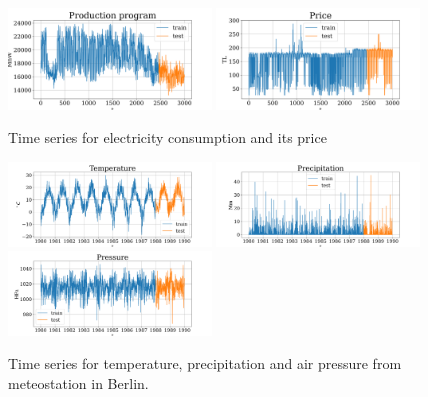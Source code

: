 	\begin{figure}[h]
		\centering
		\includegraphics[width=0.48\textwidth, keepaspectratio]{../../figs/Electricity_Production}
		\includegraphics[width=0.48\textwidth, keepaspectratio]{../../figs/Electricity_Price}
		\caption{Time series for electricity consumption and its price}\label{fig:electr_data}
	\end{figure}
	
	\begin{figure}[h]
		\centering
		\includegraphics[width=0.48\textwidth, keepaspectratio]{../../figs/Temperature.png}
		\includegraphics[width=0.48\textwidth, keepaspectratio]{../../figs/Precipitation.png}
		\includegraphics[width=0.48\textwidth, keepaspectratio]{../../figs/Pressure.png}
		\caption{Time series for temperature, precipitation and air pressure from meteostation in Berlin.}\label{fig:weather_data}
	\end{figure}
	
